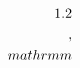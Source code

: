 \documentclass[preview]{standalone}
\begin{document}
\begin{align*}
\special{dvisvgm:raw <g id='unique000'>}1.2\\,\\mathrm{m}\special{dvisvgm:raw </g>}
\end{align*}
\end{document}
